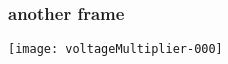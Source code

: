 \documentclass[main.tex]{subfiles}
\begin{document}
  \begin{frame}
    \frametitle{another frame}
    \texttt{[image: voltageMultiplier-000]}
  \end{frame}
\end{document}
